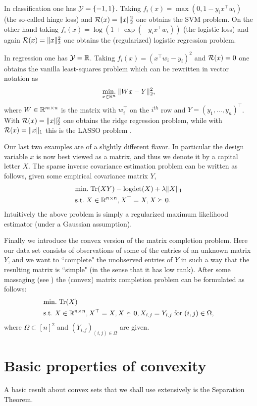 In classification one has $\mathcal{Y} = \{-1,1\}$. Taking $f_i(x) = \max(0, 1- y_i x^{\top} w_i)$ (the so-called hinge loss) and $\mathcal{R}(x) = \|x\|_2^2$ one obtains the SVM problem. On the other hand taking $f_i(x) = \log(1 + \exp(-y_i x^{\top} w_i) )$ (the logistic loss) and again $\mathcal{R}(x) = \|x\|_2^2$ one obtains the (regularized) logistic regression problem.

In regression one has $\mathcal{Y} = \mathbb{R}$. Taking $f_i(x) = (x^{\top} w_i - y_i)^2$ and $\mathcal{R}(x) = 0$ one obtains the vanilla least-squares problem which can be rewritten in vector notation as
$$\underset{x \in \mathbb{R}^n}{\mathrm{min.}} \; \|W x - Y\|_2^2 ,$$
where $W \in \mathbb{R}^{m \times n}$ is the matrix with $w_i^{\top}$ on the $i^{th}$ row and $Y =(y_1, \hdots, y_n)^{\top}$.
With $\mathcal{R}(x) = \|x\|_2^2$ one obtains the ridge regression problem, while with $\mathcal{R}(x) = \|x\|_1$ this is the LASSO problem \cite{Tib96}.

Our last two examples are of a slightly different flavor. In particular the design variable $x$ is now best viewed as a matrix, and thus we denote it by a capital letter $X$. The sparse inverse covariance estimation problem can be written as follows, given some empirical covariance matrix $Y$,
\begin{align*}
& \mathrm{min.} \; \mathrm{Tr}(X Y) - \mathrm{logdet}(X) + \lambda \|X\|_1 \\
& \text{s.t.} \; X \in \mathbb{R}^{n \times n}, X^{\top} = X, X \succeq 0 .
\end{align*}
Intuitively the above problem is simply a regularized maximum likelihood estimator (under a Gaussian assumption). 

Finally we introduce the convex version of the matrix completion problem. Here our data set consists of observations of some of the entries of an unknown matrix $Y$, and we want to ``complete" the unobserved entries of $Y$ in such a way that the resulting matrix is ``simple" (in the sense that it has low rank). After some massaging (see \cite{CR09}) the (convex) matrix completion problem can be formulated as follows:
\begin{align*}
& \mathrm{min.} \; \mathrm{Tr}(X) \\
& \text{s.t.} \; X \in \mathbb{R}^{n \times n}, X^{\top} = X, X \succeq 0, X_{i,j} = Y_{i,j} \; \text{for} \; (i,j) \in \Omega ,
\end{align*}
where $\Omega \subset [n]^2$ and $(Y_{i,j})_{(i,j) \in \Omega}$ are given. 

\section{Basic properties of convexity}
A basic result about convex sets that we shall use extensively is the Separation Theorem.


